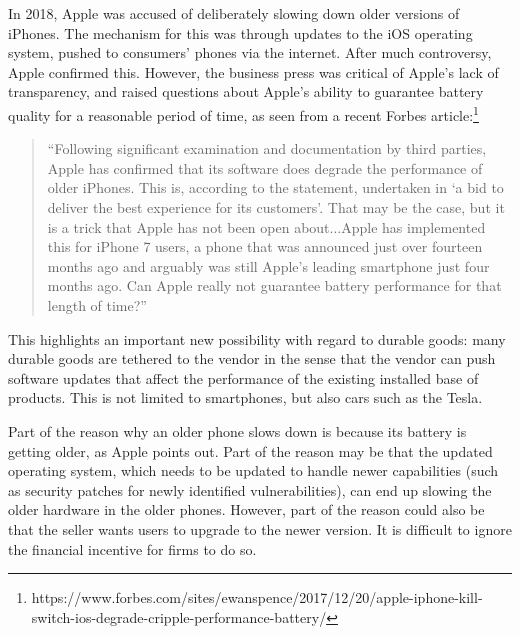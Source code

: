 \documentclass[isre,blindrev]{informs3} %
\begin{document}
In 2018, Apple was accused of deliberately slowing down older versions of iPhones. The mechanism for this was through updates to the iOS operating system, pushed to consumers' phones via the internet. After much controversy, Apple confirmed this. However, the business press was critical of Apple's lack of transparency, and raised questions about Apple's ability to guarantee battery quality for a reasonable period of time, as seen from a recent Forbes article:\footnote{https://www.forbes.com/sites/ewanspence/2017/12/20/apple-iphone-kill-switch-ios-degrade-cripple-performance-battery/} 
\begin{quote}{``}Following significant examination and documentation
by third parties, Apple has confirmed that its software does degrade the performance of older iPhones. This is, according to the statement, undertaken
in {`}a bid to deliver the best experience for its customers{'}. That may be the case, but it is a trick that Apple has not been open about...Apple has implemented this for iPhone 7 users, a phone that was announced just over fourteen months ago and arguably was still Apple’s leading smartphone just four months ago. Can Apple really not guarantee battery performance for that length of time?{''}
\end{quote}

This highlights an important new possibility with regard to durable goods: many durable goods are tethered to the vendor in the sense that the vendor can push software updates that affect the performance of the existing installed base of products. This is not limited to smartphones, but also cars such as the Tesla. 

Part of the reason why an older phone slows down is because its battery is getting older, as Apple points out. Part of the reason may be that the updated operating system, which needs to be updated to handle newer capabilities (such as security patches for newly identified vulnerabilities), can end up slowing the older hardware in the older phones. However, part of the reason could also be that the seller wants users to upgrade to the newer version. It is difficult to ignore the financial incentive for firms to do so.
\end{document}
